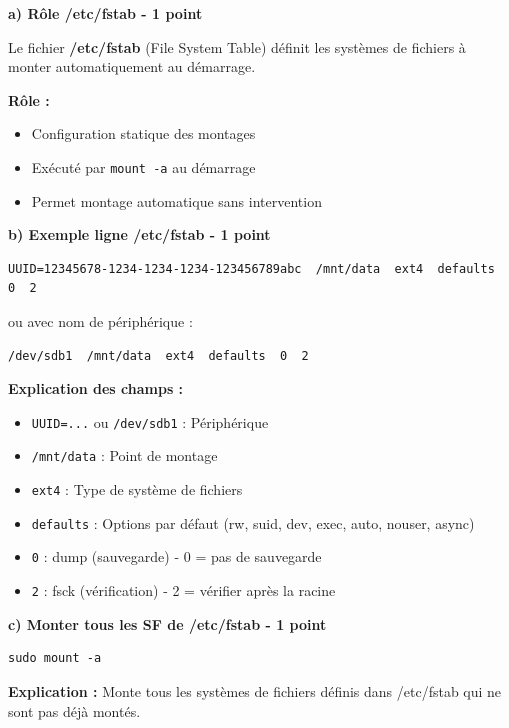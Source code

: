 \documentclass[12pt,a4paper]{article}
\begin{document}
\begin{answerbox}
\textbf{a) Rôle /etc/fstab - 1 point}

Le fichier \textbf{/etc/fstab} (File System Table) définit les systèmes de fichiers à monter automatiquement au démarrage.

\textbf{Rôle :}
\begin{itemize}
    \item Configuration statique des montages
    \item Exécuté par \texttt{mount -a} au démarrage
    \item Permet montage automatique sans intervention
\end{itemize}

\textbf{b) Exemple ligne /etc/fstab - 1 point}

\begin{verbatim}
UUID=12345678-1234-1234-1234-123456789abc  /mnt/data  ext4  defaults  0  2
\end{verbatim}

ou avec nom de périphérique :

\begin{verbatim}
/dev/sdb1  /mnt/data  ext4  defaults  0  2
\end{verbatim}

\textbf{Explication des champs :}
\begin{itemize}
    \item \texttt{UUID=...} ou \texttt{/dev/sdb1} : Périphérique
    \item \texttt{/mnt/data} : Point de montage
    \item \texttt{ext4} : Type de système de fichiers
    \item \texttt{defaults} : Options par défaut (rw, suid, dev, exec, auto, nouser, async)
    \item \texttt{0} : dump (sauvegarde) - 0 = pas de sauvegarde
    \item \texttt{2} : fsck (vérification) - 2 = vérifier après la racine
\end{itemize}

\textbf{c) Monter tous les SF de /etc/fstab - 1 point}

\begin{lstlisting}
sudo mount -a
\end{lstlisting}

\textbf{Explication :} Monte tous les systèmes de fichiers définis dans /etc/fstab qui ne sont pas déjà montés.
\end{answerbox}
\end{document}
